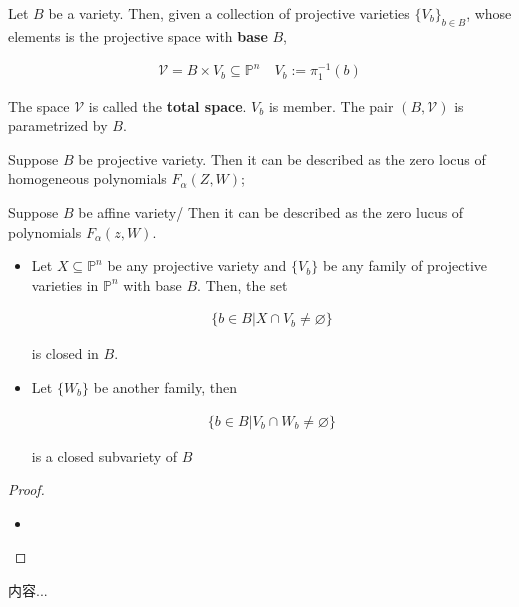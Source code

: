 \documentclass[Total.tex]{subfiles}
\begin{document}
		\begin{Def}
			Let $B$ be a variety. Then, given a collection of projective varieties $\{V_b\}_{b\in B}$, whose elements is the projective space with \textbf{base} $B$,
			
			\begin{gather*}
				\mathcal{V}=B\times V_b\subseteq \mathbb{P}^n\quad V_b:=\pi_1^{-1}(b)
			\end{gather*}
			
			The space $\mathcal{V}$ is called the \textbf{total space}. $V_b$ is member. The pair $(B,\mathcal{V})$ is parametrized by $B$. 
		\end{Def}
		
		Suppose $B$ be projective variety. Then it can be described as the zero locus of homogeneous polynomials $F_\alpha(Z,W)$;
		
		Suppose $B$ be affine variety/ Then it can be described as the zero lucus of polynomials $F_\alpha(z,W)$.
		
		\begin{lemma}
			\begin{itemize}
				\item Let $X\subseteq \mathbb{P}^n$ be any projective variety and $\{V_b\}$ be any family of projective varieties in $\mathbb{P}^n$ with base $B$. Then, the set
				
				\begin{gather*}
					\{b\in B|X\cap V_b\not=\varnothing\}
				\end{gather*} 
				
				is closed in $B$. 
				
				\item Let $\{W_b\}$ be another family, then
				
				\begin{gather*}
					\{b\in B|V_b\cap W_b\not=\varnothing\}
				\end{gather*}
				
				is a closed subvariety of $B$
			\end{itemize}
		\end{lemma}
		
		\begin{proof}
			\begin{itemize}
				\item 
				
				
			\end{itemize}
		\end{proof}
		
		\begin{lemma}
			内容...
		\end{lemma}
		
\end{document}
